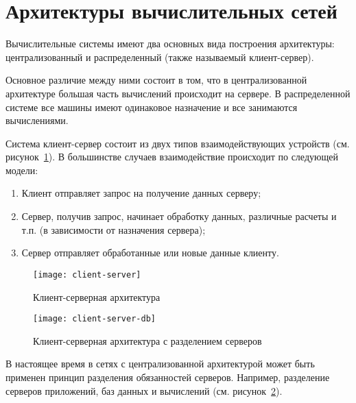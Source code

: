 \section{Архитектуры вычислительных сетей}

Вычислительные системы имеют два основных вида построения архитектуры: централизованный
и распределенный (также называемый клиент-сервер).

Основное различие между ними состоит в том, что в централизованной архитектуре большая
часть вычислений происходит на сервере. В распределенной системе все машины имеют
одинаковое назначение и все занимаются вычислениями.

Система клиент-сервер состоит из двух типов взаимодействующих устройств (см.
рисунок~\ref{pic:client-server}).
В большинстве случаев взаимодействие происходит по следующей модели:

\begin{enumerate}
    \item Клиент отправляет запрос на получение данных серверу;
    \item Сервер, получив запрос, начинает обработку данных, различные расчеты и т.п.
        (в зависимости от назначения сервера);
    \item Сервер отправляет обработанные или новые данные клиенту.
\end{enumerate}

\begin{figure}[h]
    \center
    \texttt{[image: client-server]}
    \caption{Клиент-серверная архитектура}
    \label{pic:client-server}
\end{figure}

\begin{figure}[h]
    \center
    \texttt{[image: client-server-db]}
    \caption{Клиент-серверная архитектура с разделением серверов}
    \label{pic:client-server-db}
\end{figure}

В настоящее время в сетях с централизованной архитектурой может быть применен принцип
разделения обязанностей серверов. Например, разделение серверов приложений, баз данных и
вычислений (см. рисунок~\ref{pic:client-server-db}).

